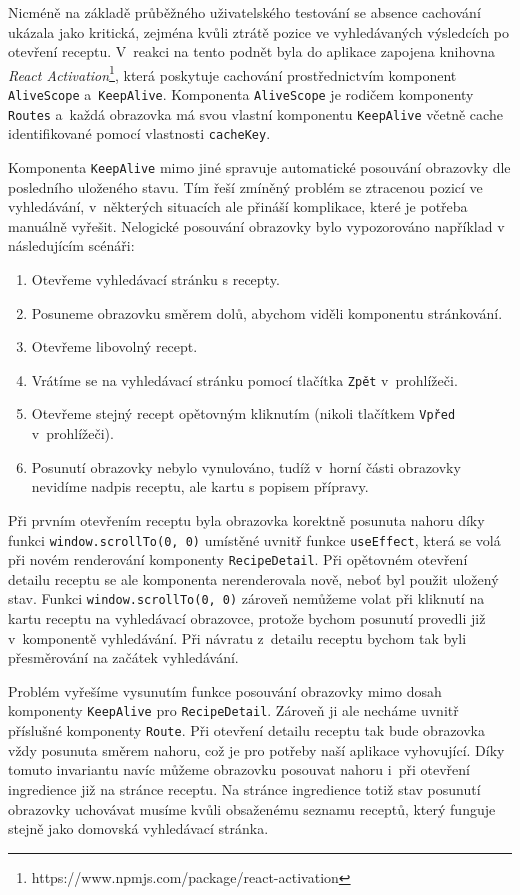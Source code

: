 Nicméně na základě průběžného uživatelského testování se absence cachování ukázala jako kritická, zejména kvůli ztrátě pozice ve vyhledávaných výsledcích po otevření receptu. V~reakci na tento podnět byla do aplikace zapojena knihovna \emph{React Activation}\footnote{https://www.npmjs.com/package/react-activation}, která poskytuje cachování prostřednictvím komponent \texttt{AliveScope} a~\texttt{KeepAlive}. Komponenta \texttt{AliveScope} je rodičem komponenty \texttt{Routes} a~každá obrazovka má svou vlastní komponentu \texttt{KeepAlive} včetně cache identifikované pomocí vlastnosti \texttt{cacheKey}.

Komponenta \texttt{KeepAlive} mimo jiné spravuje automatické posouvání obrazovky dle posledního uloženého stavu. Tím řeší zmíněný problém se ztracenou pozicí ve vyhledávání, v~některých situacích ale přináší komplikace, které je potřeba manuálně vyřešit. Nelogické posouvání obrazovky bylo vypozorováno například v následujícím scénáři:

\begin{enumerate}
    \item Otevřeme vyhledávací stránku s recepty.
    \item Posuneme obrazovku směrem dolů, abychom viděli komponentu stránkování.
    \item Otevřeme libovolný recept.
    \item Vrátíme se na vyhledávací stránku pomocí tlačítka \texttt{Zpět} v~prohlížeči.
    \item Otevřeme stejný recept opětovným kliknutím (nikoli tlačítkem \texttt{Vpřed} v~prohlížeči).
    \item Posunutí obrazovky nebylo vynulováno, tudíž v~horní části obrazovky nevidíme nadpis receptu, ale kartu s popisem přípravy.
\end{enumerate}

Při prvním otevřením receptu byla obrazovka korektně posunuta nahoru díky funkci \texttt{window.scrollTo(0,\,0)} umístěné uvnitř funkce \texttt{useEffect}, která se volá při novém renderování komponenty \texttt{RecipeDetail}. Při opětovném otevření detailu receptu se ale komponenta nerenderovala nově, neboť byl použit uložený stav. Funkci \texttt{window.scrollTo(0,\,0)} zároveň nemůžeme volat při kliknutí na kartu receptu na vyhledávací obrazovce, protože bychom posunutí provedli již v~komponentě vyhledávání. Při návratu z~detailu receptu bychom tak byli přesměrování na začátek vyhledávání.

Problém vyřešíme vysunutím funkce posouvání obrazovky mimo dosah komponenty \texttt{KeepAlive} pro \texttt{RecipeDetail}. Zároveň ji ale necháme uvnitř příslušné komponenty \texttt{Route}. Při otevření detailu receptu tak bude obrazovka vždy posunuta směrem nahoru, což je pro potřeby naší aplikace vyhovující. Díky tomuto invariantu navíc můžeme obrazovku posouvat nahoru i~při otevření ingredience již na stránce receptu. Na stránce ingredience totiž stav posunutí obrazovky uchovávat musíme kvůli obsaženému seznamu receptů, který funguje stejně jako domovská vyhledávací stránka.

